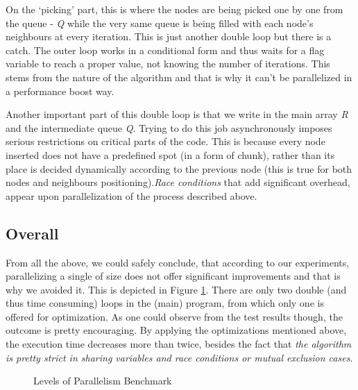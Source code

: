 On the `picking' part, this is where the nodes are being picked one by one from the queue - \textit{Q} while the very same queue is being filled with each node's neighbours at every iteration. This is just another double loop but there is a catch. The outer loop works in a conditional  form and thus waits for a flag variable to reach a proper value, not knowing the number of iterations. This stems from the nature of the algorithm and that is why it can't be parallelized in a performance boost way.

Another important part of this double loop is that we write in the main array \textit{R} and the intermediate queue \textit{Q}. Trying to do this job asynchronously imposes serious restrictions on critical parts of the code. This is because every node inserted does not have a predefined spot (in a form of chunk), rather than its place is decided dynamically according to the previous node (this is true for both nodes and neighbours positioning).\textit{Race conditions} that add significant overhead, appear upon parallelization of the process described above.
\bigbreak 

\subsection{Overall}
From all the above, we could safely conclude, that according to our experiments, parallelizing a single  of size  does not offer significant improvements and that is why we avoided it. This is depicted in Figure \ref{fig:parallelism}. There are only two double (and thus time consuming) loops in the (main) program, from which only one is offered for optimization. As one could observe from the test results though, the outcome is pretty encouraging. By applying the optimizations mentioned above, the execution time decreases more than twice, besides the fact that \textit{the algorithm is pretty strict in sharing variables and race conditions or mutual exclusion cases}.
\bigbreak 


\begin{figure}
    \centering
    
    \caption{Levels of Parallelism Benchmark}
    \label{fig:parallelism}
\end{figure}